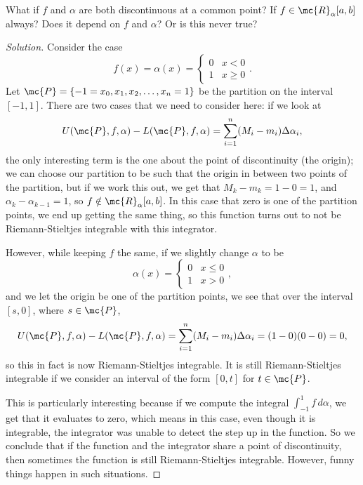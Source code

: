 \begin{fft}
	What if \(f\) and \(\alpha\) are both discontinuous at a common point? If \(f\in\mc{R}_{\alpha}[a,b]\) always? Does it depend on \(f\) and \(\alpha\)? Or is this never true? 
\end{fft}
\begin{proof}[Solution]
	Consider the case
	\begin{equation*}
		f(x)=\alpha(x)=\begin{cases}
						0&x<0\\
						1&x\geq 0
					   \end{cases}.
	\end{equation*}
	Let \(\mc{P}=\{-1=x_0,x_1,x_2,\dots,x_n=1\}\) be the partition on the interval \([-1,1]\). There are two cases that we need to consider here: if we look at 
	\begin{equation*}
		U(\mc{P},f,\alpha)-L(\mc{P},f,\alpha)=\sum_{i=1}^n(M_i-m_i)\Delta\alpha_i,
	\end{equation*}
	the only interesting term is the one about the point of discontinuity (the origin); we can choose our partition to be such that the origin in between two points of the partition, but if we work this out, we get that \(M_k-m_k=1-0=1\), and \(\alpha_{k}-\alpha_{k-1}=1\), so \(f\notin\mc{R}_{\alpha}[a,b]\). In this case that zero is one of the partition points, we end up getting the same thing, so this function turns out to not be Riemann-Stieltjes integrable with this integrator. 
	
	\medskip
	
	However, while keeping \(f\) the same, if we slightly change \(\alpha\) to be 
	\begin{equation*}
		\alpha(x)=\begin{cases}
					0&x\leq 0\\
					1&x>0
				  \end{cases},
	\end{equation*}
	and we let the origin be one of the partition points, we see that over the interval \([s,0]\), where \(s\in\mc{P}\), 
	\begin{equation*}
		U(\mc{P},f,\alpha)-L(\mc{P},f,\alpha)=\sum_{i=1}^n(M_i-m_i)\Delta\alpha_i=(1-0)(0-0)=0,
	\end{equation*}
	so this in fact is now Riemann-Stieltjes integrable. It is still Riemann-Stieltjes integrable if we consider an interval of the form \([0,t]\) for \(t\in\mc{P}\).
	
	\medskip
	
	This is particularly interesting because if we compute the integral \(\displaystyle\int_{-1}^1 f \, d\alpha\), we get that it evaluates to zero, which means in this case, even though it is integrable, the integrator was unable to detect the step up in the function. So we conclude that if the function and the integrator share a point of discontinuity, then sometimes the function is still Riemann-Stieltjes integrable. However, funny things happen in such situations.
\end{proof}

